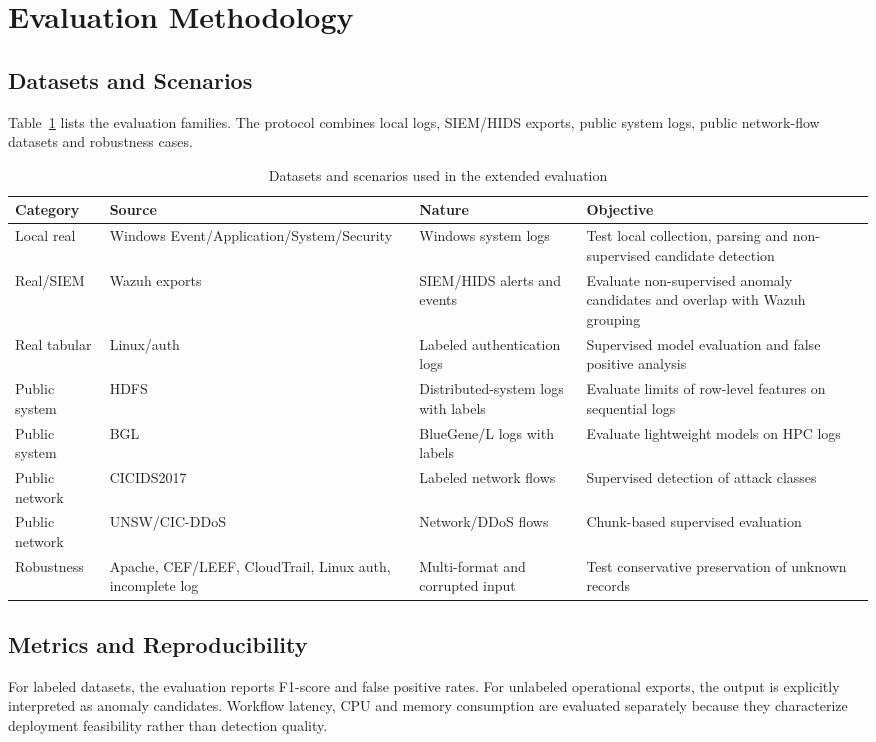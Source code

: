 \documentclass[journal]{IEEEtran}
\begin{document}
\section{Evaluation Methodology}
\subsection{Datasets and Scenarios}
Table~\ref{tab:datasets} lists the evaluation families. The protocol combines local logs, SIEM/HIDS exports, public system logs, public network-flow datasets and robustness cases.

\begin{table}[t]
\caption{Datasets and scenarios used in the extended evaluation}
\label{tab:datasets}
\centering
\scriptsize
\begin{tabularx}{\textwidth}{p{2.3cm}p{3.2cm}p{3.0cm}X}
\toprule
\textbf{Category} & \textbf{Source} & \textbf{Nature} & \textbf{Objective} \\
\midrule
Local real & Windows Event/Application/System/Security & Windows system logs & Test local collection, parsing and non-supervised candidate detection \\
Real/SIEM & Wazuh exports & SIEM/HIDS alerts and events & Evaluate non-supervised anomaly candidates and overlap with Wazuh grouping \\
Real tabular & Linux/auth & Labeled authentication logs & Supervised model evaluation and false positive analysis \\
Public system & HDFS & Distributed-system logs with labels & Evaluate limits of row-level features on sequential logs \\
Public system & BGL & BlueGene/L logs with labels & Evaluate lightweight models on HPC logs \\
Public network & CICIDS2017 & Labeled network flows & Supervised detection of attack classes \\
Public network & UNSW/CIC-DDoS & Network/DDoS flows & Chunk-based supervised evaluation \\
Robustness & Apache, CEF/LEEF, CloudTrail, Linux auth, incomplete log & Multi-format and corrupted input & Test conservative preservation of unknown records \\
\bottomrule
\end{tabularx}
\end{table}

\subsection{Metrics and Reproducibility}
For labeled datasets, the evaluation reports F1-score and false positive rates. For unlabeled operational exports, the output is explicitly interpreted as anomaly candidates. Workflow latency, CPU and memory consumption are evaluated separately because they characterize deployment feasibility rather than detection quality.
\end{document}
